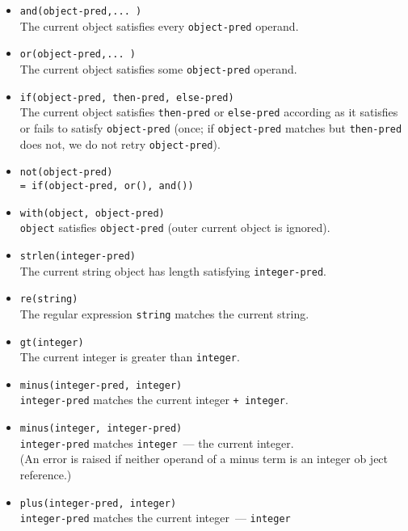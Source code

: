 \begin{itemize}
  \item 
\verb|and(object-pred,... )|\\
The current object satisfies every \verb|object-pred| operand. 
  \item 
\verb|or(object-pred,... )|\\
The current object satisfies some \verb|object-pred| operand. 
  \item 
\verb|if(object-pred, then-pred, else-pred)|\\
The current object satisfies \verb|then-pred| or \verb|else-pred| according as
it satisfies or fails to satisfy \verb|object-pred| (once; if \verb|object-pred|
matches but \verb|then-pred| does not, we do not retry \verb|object-pred|). 
  \item 
\verb|not(object-pred)|\\
\verb|= if(object-pred, or(), and())|
  \item 
\verb|with(object, object-pred)|\\
\verb|object| satisfies \verb|object-pred| (outer current object is ignored).
  \item 
\verb|strlen(integer-pred)|\\
The current string object has length satisfying \verb|integer-pred|. 
  \item 
\verb|re(string)|\\
The regular expression \verb|string| matches the current string. 
  \item 
\verb|gt(integer)|\\
The current integer is greater than \verb|integer|. 
  \item 
\verb|minus(integer-pred, integer)|\\
\verb|integer-pred| matches the current integer \verb|+ integer|. 
  \item 
\verb|minus(integer, integer-pred)|\\
\verb|integer-pred| matches \verb|integer|\ --- the current integer.\\
(An error is raised if neither operand of a minus term
is an integer ob ject reference.) 
  \item 
\verb|plus(integer-pred, integer)|\\
\verb|integer-pred| matches the current integer\ --- \verb|integer|
\end{itemize}

\secup

\secrel{}\secdown
{}\label{crew31}
\secup

\secup